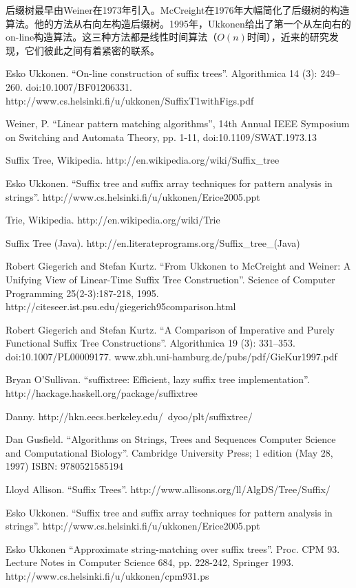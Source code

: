 \documentclass{ctexart}
\begin{document}
后缀树最早由Weiner在1973年引入\cite{weiner73}。McCreight在1976年大幅简化了后缀树的构造算法。他的方法从右向左构造后缀树。1995年，Ukkonen给出了第一个从左向右的on-line构造算法。这三种方法都是线性时间算法（$O(n)$时间），近来的研究发现，它们彼此之间有着紧密的联系\cite{GieKur97}。

\ifx\wholebook\relax \else
\begin{thebibliography}{99}

Esko Ukkonen. ``On-line construction of suffix trees''. Algorithmica 14 (3): 249--260. doi:10.1007/BF01206331. http://www.cs.helsinki.fi/u/ukkonen/SuffixT1withFigs.pdf

Weiner, P. ``Linear pattern matching algorithms'', 14th Annual IEEE Symposium on Switching and Automata Theory, pp. 1-11, doi:10.1109/SWAT.1973.13

Suffix Tree, Wikipedia. http://en.wikipedia.org/wiki/Suffix\_tree

Esko Ukkonen. ``Suffix tree and suffix array techniques for pattern analysis in strings''. http://www.cs.helsinki.fi/u/ukkonen/Erice2005.ppt

Trie, Wikipedia. http://en.wikipedia.org/wiki/Trie

Suffix Tree (Java). http://en.literateprograms.org/Suffix\_tree\_(Java)

Robert Giegerich and Stefan Kurtz. ``From Ukkonen to McCreight and Weiner: A Unifying View of Linear-Time Suffix Tree Construction''. Science of Computer Programming 25(2-3):187-218, 1995. http://citeseer.ist.psu.edu/giegerich95comparison.html

Robert Giegerich and Stefan Kurtz. ``A Comparison of Imperative and Purely Functional Suffix Tree Constructions''. Algorithmica 19 (3): 331--353. doi:10.1007/PL00009177. www.zbh.uni-hamburg.de/pubs/pdf/GieKur1997.pdf

Bryan O'Sullivan. ``suffixtree: Efficient, lazy suffix tree implementation''. http://hackage.haskell.org/package/suffixtree

Danny. http://hkn.eecs.berkeley.edu/~dyoo/plt/suffixtree/

Dan Gusfield. ``Algorithms on Strings, Trees and Sequences Computer Science and Computational Biology''. Cambridge University Press; 1 edition (May 28, 1997) ISBN: 9780521585194

Lloyd Allison. ``Suffix Trees''. http://www.allisons.org/ll/AlgDS/Tree/Suffix/

Esko Ukkonen. ``Suffix tree and suffix array techniques for pattern analysis in strings''. http://www.cs.helsinki.fi/u/ukkonen/Erice2005.ppt

Esko Ukkonen ``Approximate string-matching over suffix trees''. Proc. CPM 93. Lecture Notes in Computer Science 684, pp. 228-242, Springer 1993. http://www.cs.helsinki.fi/u/ukkonen/cpm931.ps

\end{thebibliography}
\end{document}
